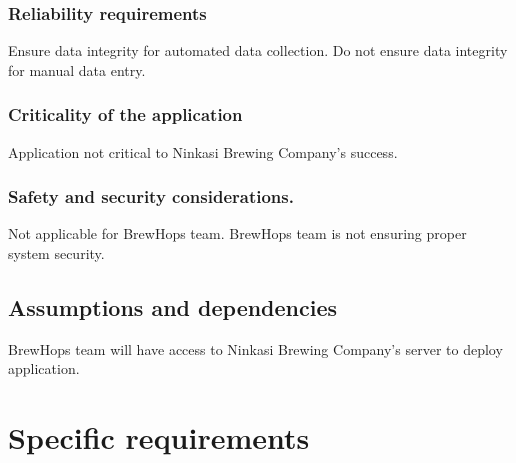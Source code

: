\documentclass[draftclsnofoot,onecolumn,letterpaper,10pt,compsoc]{IEEEtran}
\begin{document}
		\subsubsection{Reliability requirements}
        Ensure data integrity for automated data collection. Do not ensure data integrity for manual data entry.
        
		\subsubsection{Criticality of the application}
        Application not critical to Ninkasi Brewing Company's success.
        
		\subsubsection{Safety and security considerations.}
        Not applicable for BrewHops team. BrewHops team is not ensuring proper system security.
        
	\subsection{Assumptions and dependencies}
    BrewHops team will have access to Ninkasi Brewing Company's server to deploy application.

\section{Specific requirements}
\end{document}
